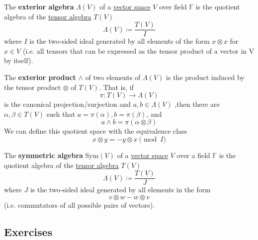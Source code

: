   \begin{definition}
    \label{def:exterior-algebra}
    The \textbf{exterior algebra} $\Lambda(V)$ of a \hyperref[def:vector-space]{vector space} $V$ over field $\mathbb{F}$ is the quotient algebra of the \hyperref[def:tensor-algebra]{tensor algebra} $T(V)$
    \begin{equation}
      \Lambda(V) \coloneqq \frac{T(V)}{I}
    \end{equation}
    where $I$ is the two-sided ideal generated by all elements of the form $x \otimes x$ for $x \in V$ (i.e. all tensors that can be expressed as the tensor product of a vector in V by itself). 

    The \textbf{exterior product} $\wedge$ of two elements of $\Lambda(V)$ is the product induced by the tensor product $\otimes$ of $T(V)$. That is, if 
    \begin{equation}
      \pi: T(V) \to \Lambda(V)
    \end{equation}
    is the canonical projection/surjection and $a, b \in \Lambda(V)$ ,then there are $\alpha, \beta \in T(V)$ such that $a = \pi(\alpha), b = \pi(\beta)$, and 
    \begin{equation}
      a \wedge b = \pi(\alpha \otimes \beta)
    \end{equation}
    We can define this quotient space with the equivalence class
    \begin{equation}
      x \otimes y = - y \otimes x \pmod{I}
    \end{equation}
  \end{definition}

  \begin{definition}
    \label{def:symmetric-algebra}
    The \textbf{symmetric algebra} Sym$(V)$ of a \hyperref[def:vector-space]{vector space} $V$ over a field $\mathbb{F}$ is the quotient algebra of the \hyperref[def:tensor-algebra]{tensor algebra} $T(V)$ 
    \begin{equation}
      \Lambda(V) \coloneqq \frac{T(V)}{J}
    \end{equation}
    where $J$ is the two-sided ideal generated by all elements in the form 
    \begin{equation}
      v \otimes w - w \otimes v
    \end{equation}
    (i.e. commutators of all possible pairs of vectors). 
  \end{definition}

\subsection{Exercises}
